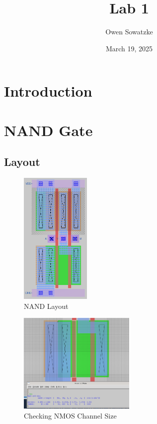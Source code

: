 \documentclass{article}
\title{Lab 1}
\author{Owen Sowatzke}
\date{March 19, 2025}
\newcommand{\zerodisplayskip}{
	\setlength{\abovedisplayskip}{0pt}%
	\setlength{\belowdisplayskip}{0pt}%
	\setlength{\abovedisplayshortskip}{0pt}%
	\setlength{\belowdisplayshortskip}{0pt}%
	\setlength{\mathindent}{0pt}}
\begin{document}
	\maketitle
	
	\section{Introduction}
	
	\section{NAND Gate}
	
	\subsection{Layout}
	
	\begin{figure}[H]
		\centerline{\includegraphics[width=0.3\textwidth]{nand_layout.png}}
		\caption{NAND Layout}
		\label{fig::nand_layout}
	\end{figure}

	\begin{figure}[H]
		\centerline{\includegraphics[width=0.5\textwidth]{nand_nmos_channel_sizing.png}}
		\caption{Checking NMOS Channel Size}
		\label{fig::nand_nmos_channel_sizing}
	\end{figure}
	
\end{document}
